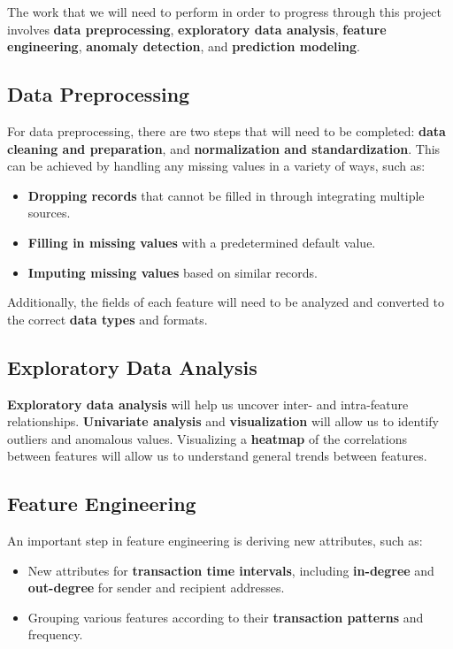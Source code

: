 \documentclass[sigconf]{acmart}
\begin{document}
The work that we will need to perform in order to progress through this project involves \textbf{data preprocessing}, \textbf{exploratory data analysis}, \textbf{feature engineering}, \textbf{anomaly detection}, and \textbf{prediction modeling}.

\subsection{Data Preprocessing}
For data preprocessing, there are two steps that will need to be completed: \textbf{data cleaning and preparation}, and \textbf{normalization and standardization}. This can be achieved by handling any missing values in a variety of ways, such as:
\begin{itemize}
    \item \textbf{Dropping records} that cannot be filled in through integrating multiple sources.
    \item \textbf{Filling in missing values} with a predetermined default value.
    \item \textbf{Imputing missing values} based on similar records.
\end{itemize}
Additionally, the fields of each feature will need to be analyzed and converted to the correct \textbf{data types} and formats.

\subsection{Exploratory Data Analysis}
\textbf{Exploratory data analysis} will help us uncover inter- and intra-feature relationships. \textbf{Univariate analysis} and \textbf{visualization} will allow us to identify outliers and anomalous values. Visualizing a \textbf{heatmap} of the correlations between features will allow us to understand general trends between features.

\subsection{Feature Engineering}
An important step in feature engineering is deriving new attributes, such as:
\begin{itemize}
    \item New attributes for \textbf{transaction time intervals}, including \textbf{in-degree} and \textbf{out-degree} for sender and recipient addresses.
    \item Grouping various features according to their \textbf{transaction patterns} and frequency.
\end{itemize}
\end{document}
